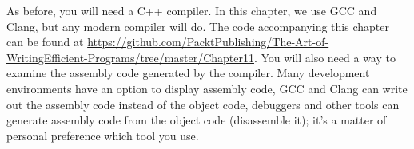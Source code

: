 As before, you will need a C++ compiler. In this chapter, we use GCC and Clang, but any modern compiler will do. The code accompanying this chapter can be found at \url{https://github.com/PacktPublishing/The-Art-of-WritingEfficient-Programs/tree/master/Chapter11}. You will also need a way to examine the assembly code generated by the compiler. Many development environments have an option to display assembly code, GCC and Clang can write out the assembly code instead of the object code, debuggers and other tools can generate assembly code from the object code (disassemble it); it's a matter of personal preference which tool you use.